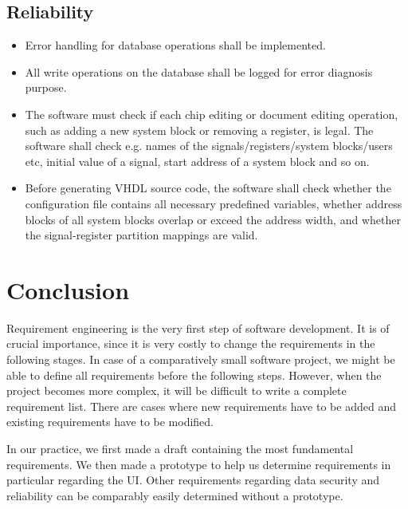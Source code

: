 \subsection{Reliability}
\begin{itemize}
\item Error handling for database operations shall be implemented.
\item All write operations on the database shall be logged for error diagnosis purpose.
\item The software must check if each chip editing or document editing operation, such as adding a new system block or removing a register, is legal. The software shall check e.g. names of the signals/registers/system blocks/users etc, initial value of a signal, start address of a system block and so on.
\item Before generating VHDL source code, the software shall check whether the configuration file contains all necessary predefined variables, whether address blocks of all system blocks overlap or exceed the address width, and whether the signal-register partition mappings are valid.
\end{itemize}

\section{Conclusion}
Requirement engineering is the very first step of software development. It is of crucial importance, since it is very costly to change the requirements in the following stages. In case of a comparatively small software project, we might be able to define all requirements before the following steps. However, when the project becomes more complex, it will be difficult to write a complete requirement list. There are cases where new requirements have to be added and existing requirements have to be modified.

In our practice, we first made a draft containing the most fundamental requirements. We then made a prototype to help us determine requirements in particular regarding the UI. Other requirements regarding data security and reliability can be comparably easily determined without a prototype.